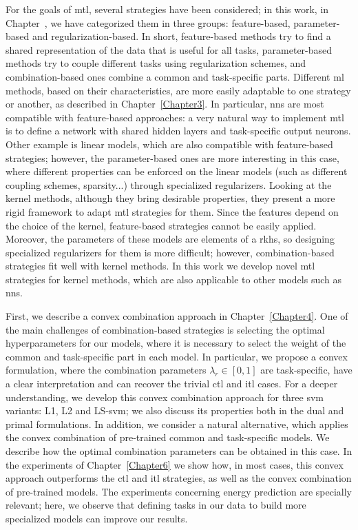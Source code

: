 For the goals of \acrshort{mtl}, several strategies have been considered; in this work, in Chapter~, we have categorized them in three groups: feature-based, parameter-based and regularization-based.
In short, feature-based methods try to find a shared representation of the data that is useful for all tasks, parameter-based methods try to couple different tasks using regularization schemes, and combination-based ones combine a common and task-specific parts.
Different \acrshort{ml} methods, based on their characteristics, are more easily adaptable to one strategy or another, as described in Chapter~\ref{Chapter3}. In particular, \acrfull{nns} are most compatible with feature-based approaches: a very natural way to implement \acrshort{mtl} is to define a network with shared hidden layers and task-specific output neurons.
Other example is linear models, which are also compatible with feature-based strategies; however, the parameter-based ones are more interesting in this case, where different properties can be enforced on the linear models (such as different coupling schemes, sparsity...) through specialized regularizers.
Looking at the kernel methods, although they bring desirable properties, they present a more rigid framework to adapt \acrshort{mtl} strategies for them. Since the features depend on the choice of the kernel, feature-based strategies cannot be easily applied. Moreover, the parameters of these models are elements of a \acrfull{rkhs}, so designing specialized regularizers for them is more difficult; however, combination-based strategies fit well with kernel methods.
%
In this work we develop novel \acrshort{mtl} strategies for kernel methods, which are also applicable to other models such as \acrshort{nns}.


%
First, we describe a convex combination approach in Chapter~\ref{Chapter4}. One of the main challenges of combination-based strategies is selecting the optimal hyperparameters for our models, where it is necessary to select the weight of the common and task-specific part in each model. In particular, we propose a convex formulation, where the combination parameters $\lambda_r \in [0, 1]$ are task-specific, have a clear interpretation and can recover the trivial \acrshort{ctl} and \acrshort{itl} cases.
%
For a deeper understanding, we develop this convex combination approach for three \acrshort{svm} variants: L1, L2 and LS-\acrshort{svm}; we also discuss its properties both in the dual and primal formulations.
%
In addition, we consider a natural alternative, which applies the convex combination of pre-trained common and task-specific models. We describe how the optimal combination parameters can be obtained in this case.
%
In the experiments of Chapter~\ref{Chapter6} we show how, in most cases, this convex approach outperforms the \acrshort{ctl} and \acrshort{itl} strategies, as well as the convex combination of pre-trained models.
The experiments concerning energy prediction are specially relevant; here, we observe that defining tasks in our data to build more specialized models can improve our results.

